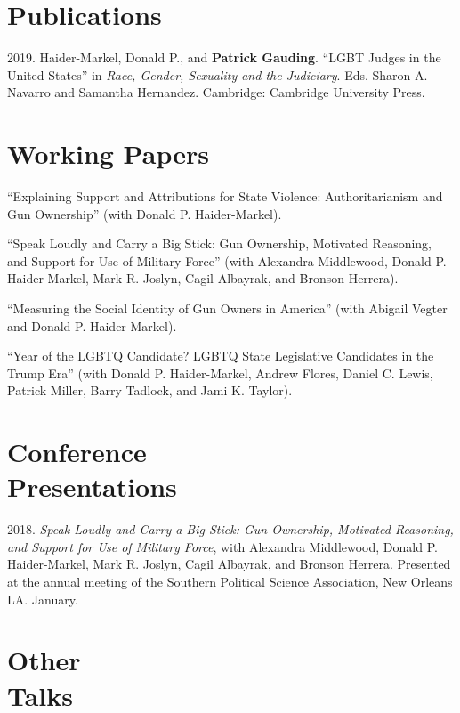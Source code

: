 \documentclass[margin,line,pifont,palatino,courier]{res}
\newenvironment{list1}{
  \begin{list}{\ding{113}}{%
      \setlength{\itemsep}{0in}
      \setlength{\parsep}{0in} \setlength{\parskip}{0in}
      \setlength{\topsep}{0in} \setlength{\partopsep}{0in}
      \setlength{\leftmargin}{0.17in}}}{\end{list}}
\newenvironment{list2}{
  \begin{list}{$\bullet$}{%
      \setlength{\itemsep}{0in}
      \setlength{\parsep}{0in} \setlength{\parskip}{0in}
      \setlength{\topsep}{0in} \setlength{\partopsep}{0in}
      \setlength{\leftmargin}{0.2in}}}{\end{list}}
\begin{document}
\begin{resume}
\begin{list1}

\end{list1}


\section{\sc Publications}

2019. Haider-Markel, Donald P., and \textbf{Patrick Gauding}. ``LGBT Judges
in the United States'' in \textit{Race, Gender, Sexuality and the
  Judiciary}. Eds. Sharon A. Navarro  and Samantha
Hernandez. Cambridge: Cambridge University Press.

\section{\sc Working Papers}

``Explaining Support and Attributions for State Violence:
Authoritarianism and Gun Ownership'' (with Donald P. Haider-Markel).

``Speak Loudly and Carry a Big Stick: Gun Ownership, Motivated
Reasoning, and Support for Use of Military Force'' (with Alexandra
Middlewood, Donald P. Haider-Markel, Mark R. Joslyn, Cagil Albayrak,
and Bronson Herrera).

``Measuring the Social Identity of Gun Owners in America'' (with
Abigail Vegter and Donald P. Haider-Markel).

``Year of the LGBTQ Candidate? LGBTQ State Legislative Candidates in
the Trump Era'' (with Donald P. Haider-Markel, Andrew Flores, Daniel
C. Lewis, Patrick Miller, Barry Tadlock, and Jami K. Taylor).

\section{\sc Conference \\ Presentations}

2018. \emph{Speak Loudly and Carry a Big Stick: Gun Ownership, Motivated
  Reasoning, and Support for Use of Military Force}, with Alexandra
Middlewood, Donald P. Haider-Markel, Mark R. Joslyn, Cagil Albayrak,
and Bronson Herrera. Presented at the annual meeting of the Southern
Political Science Association, New Orleans LA. January.

\section{\sc Other\\ Talks}


\end{resume}
\end{document}

